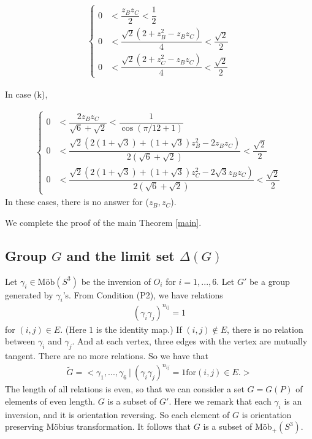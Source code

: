 \documentclass[suppldata, dvipdfmx]{interact}
\theoremstyle{plain}%
\theoremstyle{definition}
\theoremstyle{remark}
\theoremstyle{problemstyle}
\begin{document}
\begin{align*}
 \begin{cases}
  0 &< \dfrac{z_Bz_C}{2} < \dfrac{1}{2}\\
  0 &< \dfrac{\sqrt{2}(2 + z^2_B - z_B z_C)}{4} < \dfrac{\sqrt{2}}{2}\\
  0 &< \dfrac{\sqrt{2}(2 + z^2_C - z_B z_C)}{4} < \dfrac{\sqrt{2}}{2}
 \end{cases}
\end{align*}

In case (k),

\begin{align*}
 \begin{cases}
  0 &< \dfrac{2z_Bz_C}{\sqrt{6} + \sqrt{2}} < \dfrac{1}{\cos(\pi/12+1)}\\
  0 &< \dfrac{\sqrt{2}(2 (1 + \sqrt{3}) + (1 + \sqrt{3})z^2_B -2z_Bz_C)}
  {2(\sqrt{6} + \sqrt{2})} < \dfrac{\sqrt{2}}{2}\\
  0 &< \dfrac{\sqrt{2}(2 (1 + \sqrt{3}) + (1 + \sqrt{3})z^2_C
  -2\sqrt{3}z_Bz_C)}
  {2(\sqrt{6} + \sqrt{2})} < \dfrac{\sqrt{2}}{2}
 \end{cases}
\end{align*}
In these cases, there is no answer for ($z_B, z_C$).

We complete the proof of the main Theorem \ref{main}.

\subsection{Group $G$ and the limit set $\Delta(G)$}
Let $\gamma_i \in \text{M\"ob}(S^3)$ be the inversion of $O_i$ for $i =
1,...,6$.
Let $G'$ be a group generated by $\gamma_i$'s. From Condition (P2), we
have relations
\begin{align*}
 (\gamma_i \gamma_j)^{n_{ij}} = 1
\end{align*}
for $(i, j) \in E.$ (Here $1$ is the identity map.) If $(i, j) \notin E$,
there is no relation between $\gamma_i$ and $\gamma_j$.
And at each vertex, three edges with the vertex are mutually tangent.
There are no more relations. So we have that
\begin{align*}
 \tilde G = <\gamma_1, ...,\gamma_6~|~(\gamma_i\gamma_j)^{n_{ij}} = 1 \text{for}
 (i, j) \in E.>
\end{align*}
The length of all relations is even, so that we can consider a set $G = G(P)$
of elements of even length. $G$ is a subset of $G'$. Here we remark
that each $\gamma_i$ is an inversion, and it is orientation reversing. So
each element of $G$ is orientation preserving M\"obius transformation.
It follows that $G$ is a subset of M\"ob$_+(S^3)$.
\end{document}
